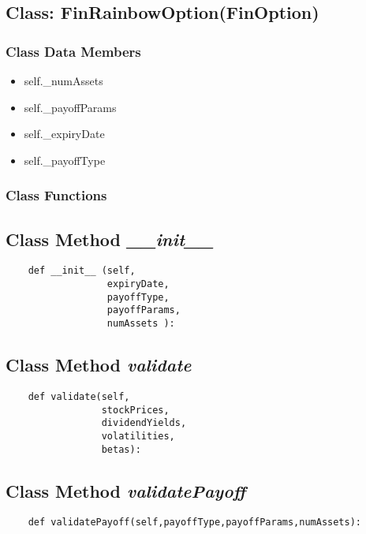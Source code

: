 \documentclass[twoside,11pt]{book}
\begin{document}
\subsection{Class: FinRainbowOption(FinOption)}


\subsubsection{Class Data Members}
\begin{itemize}
\item{self.\_numAssets}
\item{self.\_payoffParams}
\item{self.\_expiryDate}
\item{self.\_payoffType}
\end{itemize}

\subsubsection{Class Functions}

\subsection{Class Method {\it \_\_init\_\_ }}


\begin{lstlisting}
    def __init__ (self,
                  expiryDate,
                  payoffType,
                  payoffParams,
                  numAssets ):
\end{lstlisting}

\subsection{Class Method {\it validate}}


\begin{lstlisting}
    def validate(self, 
                 stockPrices,
                 dividendYields,
                 volatilities, 
                 betas):
\end{lstlisting}

\subsection{Class Method {\it validatePayoff}}


\begin{lstlisting}
    def validatePayoff(self,payoffType,payoffParams,numAssets):
\end{lstlisting}
\end{document}
